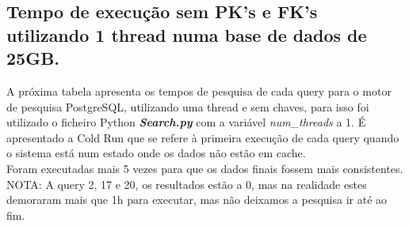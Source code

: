 \documentclass{article}
\begin{document}
\begin{table}[H]
    \centering
    \renewcommand{\arraystretch}{1.7}
    \caption{Tempo de criação das chaves estrangeiras em segundos para cada motor de pesquisa.(FK)}
    \label{tab:BC_Table3}
  \end{table}
\clearpage


\subsection{Tempo de execução sem PK's e FK's utilizando 1 thread numa base de dados de 25GB.}
\quad A próxima tabela apresenta os tempos de pesquisa de cada query para o motor de pesquisa PostgreSQL, utilizando uma thread e sem chaves, para isso foi utilizado o ficheiro Python \textbf{\textit{Search.py}}  com a variável \textit{num\_threads} a 1. 
\quad É apresentado a Cold Run que se refere à primeira execução de cada query quando o sistema está num estado onde os dados não estão em cache.\\
Foram executadas mais 5 vezes para que os dados finais fossem mais consistentes.\\
NOTA: A query 2, 17 e 20, os resultados estão a 0, mas na realidade estes demoraram mais que 1h para executar, mas não deixamos a pesquisa ir até ao fim.
\end{document}
